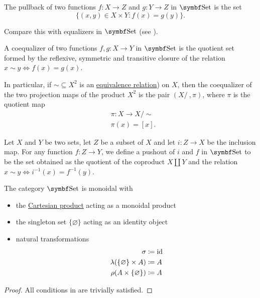 \begin{proposition}
\begin{DefEnum}
     The pullback of two functions \( f: X \to Z \) and \( g: Y \to Z \) in \( \Cat{Set} \) is the set
    \begin{equation*}
      \{ (x, y) \in X \times Y \colon f(x) = g(y) \}.
    \end{equation*}

    Compare this with equalizers in \( \Cat{Set} \) (see ).

     A coequalizer of two functions \( f, g: X \to Y \) in \( \Cat{Set} \) is the quotient set formed by the reflexive, symmetric and transitive closure of the relation \( x \sim y \iff f(x) = g(x) \).

    In particular, if \( \sim \subseteq X^2 \) is an \hyperref[def:equivalence_relation]{equivalence relation}) on \( X \), then the coequalizer of the two projection maps of the product \( X^2 \) is the pair \( (X / ~, \pi) \), where \( \pi \) is the quotient map
    \begin{align*}
       & \pi: X \to X / \sim \\
       & \pi(x) = [x].
    \end{align*}

     Let \( X \) and \( Y \) be two sets, let \( Z \) be a subset of \( X \) and let \( i: Z \to X \) be the inclusion map. For any function \( f: Z \to Y \), we define a pushout of \( i \) and \( f \) in \( \Cat{Set} \) to be the set obtained as the quotient of the coproduct \( X \coprod Y \) and the relation \( x \sim y \iff i^{-1}(x) = f^{-1}(y) \).
  \end{DefEnum}
\end{proposition}

\begin{proposition}\label{thm:set_is_monoidal}
  The category \( \Cat{Set} \) is monoidal with
  \begin{itemize}
    \item the \hyperref[def:cartesian_product]{Cartesian product} acting as a monoidal product
    \item the singleton set \( \{ \varnothing \} \) acting as an identity object
    \item natural transformations
          \begin{align*}
            \sigma                              & \coloneqq \operatorname{id} \\
            \lambda(\{ \varnothing \} \times A) & \coloneqq A   \\
            \rho(A \times \{ \varnothing \})    & \coloneqq A
          \end{align*}
  \end{itemize}
\end{proposition}
\begin{proof}
  All conditions in  are trivially satisfied.
\end{proof}
